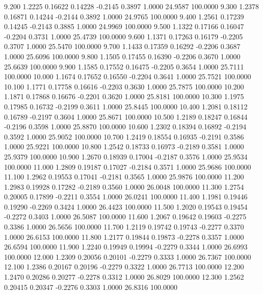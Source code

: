   9.200   1.2225   0.16622   0.14228  -0.2145   0.3897   1.0000  24.9587 100.0000
   9.300   1.2378   0.16871   0.14244  -0.2144   0.3892   1.0000  24.9765 100.0000
   9.400   1.2561   0.17239   0.14245  -0.2143   0.3885   1.0000  24.9969 100.0000
   9.500   1.1322   0.17166   0.16047  -0.2204   0.3731   1.0000  25.4739 100.0000
   9.600   1.1371   0.17263   0.16179  -0.2205   0.3707   1.0000  25.5470 100.0000
   9.700   1.1433   0.17359   0.16292  -0.2206   0.3687   1.0000  25.6096 100.0000
   9.800   1.1505   0.17455   0.16390  -0.2206   0.3670   1.0000  25.6639 100.0000
   9.900   1.1585   0.17552   0.16475  -0.2205   0.3654   1.0000  25.7111 100.0000
  10.000   1.1674   0.17652   0.16550  -0.2204   0.3641   1.0000  25.7521 100.0000
  10.100   1.1771   0.17758   0.16616  -0.2203   0.3630   1.0000  25.7875 100.0000
  10.200   1.1871   0.17868   0.16676  -0.2201   0.3620   1.0000  25.8181 100.0000
  10.300   1.1975   0.17985   0.16732  -0.2199   0.3611   1.0000  25.8445 100.0000
  10.400   1.2081   0.18112   0.16789  -0.2197   0.3604   1.0000  25.8671 100.0000
  10.500   1.2189   0.18247   0.16844  -0.2196   0.3598   1.0000  25.8870 100.0000
  10.600   1.2302   0.18394   0.16892  -0.2194   0.3592   1.0000  25.9052 100.0000
  10.700   1.2419   0.18554   0.16935  -0.2191   0.3586   1.0000  25.9221 100.0000
  10.800   1.2542   0.18733   0.16973  -0.2189   0.3581   1.0000  25.9379 100.0000
  10.900   1.2670   0.18939   0.17004  -0.2187   0.3576   1.0000  25.9534 100.0000
  11.000   1.2809   0.19187   0.17027  -0.2184   0.3571   1.0000  25.9686 100.0000
  11.100   1.2962   0.19553   0.17041  -0.2181   0.3565   1.0000  25.9876 100.0000
  11.200   1.2983   0.19928   0.17282  -0.2189   0.3560   1.0000  26.0048 100.0000
  11.300   1.2754   0.20005   0.17899  -0.2211   0.3554   1.0000  26.0241 100.0000
  11.400   1.1981   0.19446   0.19290  -0.2269   0.3424   1.0000  26.4423 100.0000
  11.500   1.2020   0.19543   0.19454  -0.2272   0.3403   1.0000  26.5087 100.0000
  11.600   1.2067   0.19642   0.19603  -0.2275   0.3386   1.0000  26.5656 100.0000
  11.700   1.2119   0.19742   0.19743  -0.2277   0.3370   1.0000  26.6153 100.0000
  11.800   1.2177   0.19844   0.19873  -0.2278   0.3357   1.0000  26.6594 100.0000
  11.900   1.2240   0.19949   0.19994  -0.2279   0.3344   1.0000  26.6993 100.0000
  12.000   1.2309   0.20056   0.20101  -0.2279   0.3333   1.0000  26.7367 100.0000
  12.100   1.2386   0.20167   0.20196  -0.2279   0.3322   1.0000  26.7713 100.0000
  12.200   1.2470   0.20286   0.20277  -0.2278   0.3312   1.0000  26.8029 100.0000
  12.300   1.2562   0.20415   0.20347  -0.2276   0.3303   1.0000  26.8316 100.0000
